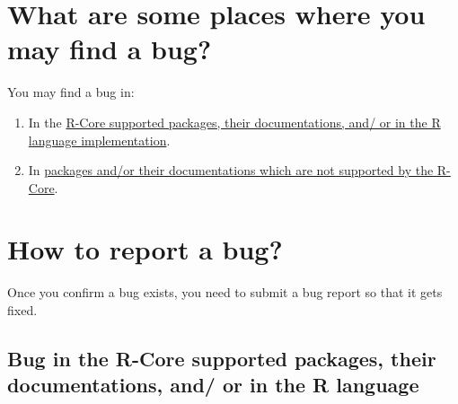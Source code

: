 \documentclass[
  letterpaper,
  DIV=11,
  numbers=noendperiod]{scrreprt}
\begin{document}
\section{What are some places where you may find a
bug?}\label{what-are-some-places-where-you-may-find-a-bug}

You may find a bug in:

\begin{enumerate}
\def\labelenumi{\arabic{enumi}.}
\item
  In the \hyperref[RCorePkgBug]{R-Core supported packages, their
  documentations, and/ or in the R language implementation}.
\item
  In \hyperref[nonRCorePkgBug]{packages and/or their documentations
  which are not supported by the R-Core}.
\end{enumerate}

\section{How to report a bug?}\label{ReportBug}

Once you confirm a bug exists, you need to submit a bug report so that
it gets fixed.

\subsection{Bug in the R-Core supported packages, their documentations,
and/ or in the R language}\label{RCorePkgBug}
\end{document}
